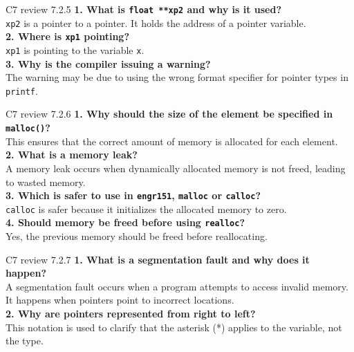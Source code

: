 \documentclass[
	11pt, %
]{beamer}
\begin{document}

\begin{frame}{C7 review 7.2.5 }
    \textbf{1. What is \texttt{float **xp2} and why is it used?} \\
    \texttt{xp2} is a pointer to a pointer. It holds the address of a pointer variable. \\
    \textbf{2. Where is \texttt{xp1} pointing?} \\
    \texttt{xp1} is pointing to the variable \texttt{x}. \\
    \textbf{3. Why is the compiler issuing a warning?} \\
    The warning may be due to using the wrong format specifier for pointer types in \texttt{printf}. \\
\end{frame}


\begin{frame}{C7 review 7.2.6}
    \textbf{1. Why should the size of the element be specified in \texttt{malloc()}?} \\
    This ensures that the correct amount of memory is allocated for each element. \\
    \textbf{2. What is a memory leak?} \\
    A memory leak occurs when dynamically allocated memory is not freed, leading to wasted memory. \\
    \textbf{3. Which is safer to use in \texttt{engr151}, \texttt{malloc} or \texttt{calloc}?} \\
    \texttt{calloc} is safer because it initializes the allocated memory to zero. \\
    \textbf{4. Should memory be freed before using \texttt{realloc}?} \\
    Yes, the previous memory should be freed before reallocating. \\
\end{frame}


\begin{frame}{C7 review 7.2.7}
    \textbf{1. What is a segmentation fault and why does it happen?} \\
    A segmentation fault occurs when a program attempts to access invalid memory. It happens when pointers point to incorrect locations. \\
    \textbf{2. Why are pointers represented from right to left?} \\
    This notation is used to clarify that the asterisk (*) applies to the variable, not the type. \\
\end{frame}
\end{document}
